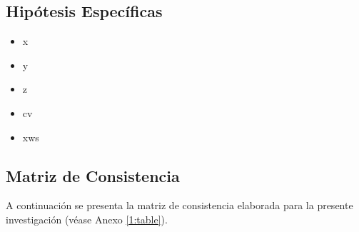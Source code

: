 \subsection{Hipótesis Específicas}
\newcommand{\Hone}{
	x
}
\newcommand{\Htwo}{
	y
}
\newcommand{\Hthree}{
	z	
}
\newcommand{\Hfour}{
	cv
}
\newcommand{\Hfive}{
	xws
}
\begin{itemize}
	\item \Hone
	\item \Htwo
	\item \Hthree
	\item \Hfour
	\item \Hfive
\end{itemize}

\subsection{Matriz de Consistencia}
A continuación se presenta la matriz de consistencia elaborada para la presente investigación (véase Anexo \ref{1:table}).

